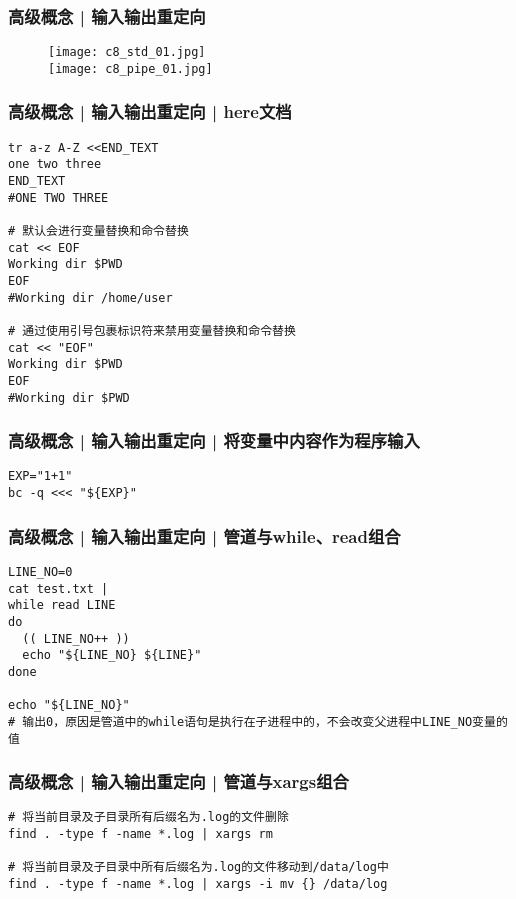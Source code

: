 \begin{frame}
  \frametitle{高级概念 | 输入输出重定向}
  \begin{figure}
    \centering
    \texttt{[image: c8\_std\_01.jpg]}\\
    \texttt{[image: c8\_pipe\_01.jpg]}
  \end{figure}
\end{frame}

\begin{frame}[fragile]
  \frametitle{高级概念 | 输入输出重定向 | here文档}
\begin{lstlisting}
tr a-z A-Z <<END_TEXT
one two three
END_TEXT
#ONE TWO THREE

# 默认会进行变量替换和命令替换
cat << EOF
Working dir $PWD
EOF
#Working dir /home/user

# 通过使用引号包裹标识符来禁用变量替换和命令替换
cat << "EOF"
Working dir $PWD
EOF
#Working dir $PWD
\end{lstlisting}
\end{frame}

\begin{frame}[fragile]
  \frametitle{高级概念 | 输入输出重定向 | 将变量中内容作为程序输入}
\begin{lstlisting}
EXP="1+1"
bc -q <<< "${EXP}"
\end{lstlisting}
\end{frame}

\begin{frame}[fragile]
  \frametitle{高级概念 | 输入输出重定向 | 管道与while、read组合}
\begin{lstlisting}
LINE_NO=0
cat test.txt |
while read LINE
do
  (( LINE_NO++ ))
  echo "${LINE_NO} ${LINE}"
done

echo "${LINE_NO}"
# 输出0，原因是管道中的while语句是执行在子进程中的，不会改变父进程中LINE_NO变量的值
\end{lstlisting}
\end{frame}

\begin{frame}[fragile]
  \frametitle{高级概念 | 输入输出重定向 | 管道与xargs组合}
\begin{lstlisting}
# 将当前目录及子目录所有后缀名为.log的文件删除
find . -type f -name *.log | xargs rm

# 将当前目录及子目录中所有后缀名为.log的文件移动到/data/log中
find . -type f -name *.log | xargs -i mv {} /data/log
\end{lstlisting}
\end{frame}

